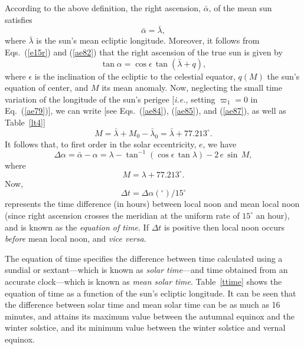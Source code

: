 According to the above definition, the right ascension, $\bar{\alpha}$, of the mean
sun satisfies
\begin{equation}
\bar{\alpha} = \bar{\lambda},
\end{equation}
where $\bar{\lambda}$ is the sun's mean ecliptic longitude. Moreover,
it follows from Eqs.~(\ref{e15r})  and (\ref{ae82}) that the right ascension
of the true sun is given by
\begin{equation}
\tan\alpha = \cos\epsilon\,\tan(\bar{\lambda}+q),
\end{equation}
where $\epsilon$ is the inclination of the ecliptic to the celestial
equator, $q(M)$  the sun's equation of center, and $M$ its mean anomaly. Now, neglecting the small time variation of the longitude of the
sun's perigee [{\em i.e.}, setting $\varpi_1=0$ in Eq.~(\ref{ae79})], we 
can write [see Eqs.~(\ref{ae84}), (\ref{ae85}), and (\ref{ae87}), as
well as Table~\ref{lt4}]
\begin{equation}
M = \bar{\lambda} + M_0-\bar{\lambda}_0 = \bar{\lambda} +77.213^\circ.
\end{equation}
It follows that, to first order in the solar eccentricity, $e$, we have
\begin{equation}
\Delta\alpha = \bar{\alpha}-\alpha = \lambda - \tan^{-1}(\cos \epsilon\,\tan\lambda) - 2\,e\,\sin\,M,
\end{equation}
where
\begin{equation}
M = \lambda + 77.213^\circ.
\end{equation}
Now,
\begin{equation}
\Delta t = \Delta\alpha(^\circ)/15^\circ
\end{equation}
represents the time difference (in hours) between local noon and mean local noon (since
right ascension crosses the meridian at the uniform rate of $15^\circ$ an
hour), and  is known as the {\em equation of time}. If $\Delta t$ is
positive then local noon occurs {\em before}\/ mean local noon, and {\em vice
versa}. 

The equation of time specifies the difference between  time calculated using a sundial or sextant---which is known as
{\em solar time}---and
time obtained from  an accurate clock---which is known as {\em mean solar time}. Table~\ref{ttime} shows the equation of time as a function of the sun's
ecliptic longitude. It can be seen that the difference between solar time and mean solar time can be as much as
16 minutes, and attains its maximum value between the autumnal equinox and the winter solstice, and its
minimum value between the winter solstice and vernal equinox.


